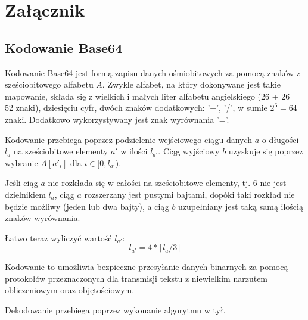 \chapter{Załącznik}\label{ch:appendix}

\section{Kodowanie Base64}\label{sec:base64}

Kodowanie Base64 jest formą zapisu danych ośmiobitowych za pomocą znaków z sześciobitowego alfabetu $A$. Zwykle alfabet, na który dokonywane jest takie mapowanie, składa się z wielkich i małych liter alfabetu angielskiego (26 + 26 = 52 znaki), dziesięciu cyfr, dwóch znaków dodatkowych: '+', '/', w sumie $2^6 = 64$ znaki. Dodatkowo wykorzystywany jest znak wyrównania '='.

Kodowanie przebiega poprzez podzielenie wejściowego ciągu danych $a$ o długości $l_a$ na sześciobitowe elementy $a'$ w ilości $l_{a'}$. Ciąg wyjściowy $b$ uzyskuje się poprzez wybranie $A[a'_i]$ dla $i \in [0, l_{a'})$.

Jeśli ciąg $a$ nie rozkłada się w całości na sześciobitowe elementy, tj. 6 nie jest dzielnikiem $l_a$, ciąg $a$ rozszerzany jest pustymi bajtami, dopóki taki rozkład nie będzie możliwy (jeden lub dwa bajty), a ciąg $b$ uzupełniany jest taką samą ilością znaków wyrównania.

Łatwo teraz wyliczyć wartość $l_{a'}$:
\begin{equation}
 l_{a'} = 4 * \lceil l_a / 3 \rceil
\end{equation}

Kodowanie to umożliwia bezpieczne przesyłanie danych binarnych za pomocą protokołów przeznaczonych dla transmisji tekstu z niewielkim narzutem obliczeniowym oraz objętościowym.

Dekodowanie przebiega poprzez wykonanie algorytmu w tył.
